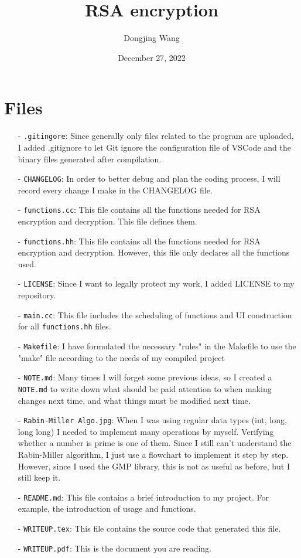 \documentclass{article}
\title{RSA encryption}
\author{Dongjing Wang}
\date{December 27, 2022}
\begin{document}
\maketitle

\section{Files}
    \begin{enumerate}
        \item[-] \texttt{.gitingore}: Since generally only files related to the program are uploaded, I added .gitignore to let Git ignore the configuration file of VSCode and the binary files generated after compilation.
        \item[-] \texttt{CHANGELOG}: In order to better debug and plan the coding process, I will record every change I make in the CHANGELOG file.
        \item[-] \texttt{functions.cc}: This file contains all the functions needed for RSA encryption and decryption. This file defines them.
        \item[-] \texttt{functions.hh}: This file contains all the functions needed for RSA encryption and decryption. However, this file only declares all the functions used.
        \item[-] \texttt{LICENSE}: Since I want to legally protect my work, I added LICENSE to my repository.
        \item[-] \texttt{main.cc}: This file includes the scheduling of functions and UI construction for all \texttt{functions.hh} files.
        \item[-] \texttt{Makefile}: I have formulated the necessary "rules" in the Makefile to use the "make" file according to the needs of my compiled project
        \item[-] \texttt{NOTE.md}: Many times I will forget some previous ideas, so I created a \texttt{NOTE.md} to write down what should be paid attention to when making changes next time, and what things must be modified next time.
        \item[-] \texttt{Rabin-Miller Algo.jpg}: When I was using regular data types (int, long, long long) I needed to implement many operations by myself. Verifying whether a number is prime is one of them. Since I still can't understand the Rabin-Miller algorithm, I just use a flowchart to implement it step by step. However, since I used the GMP library, this is not as useful as before, but I still keep it.
        \item[-] \texttt{README.md}: This file contains a brief introduction to my project. For example, the introduction of usage and functions.
        \item[-] \texttt{WRITEUP.tex}: This file contains the source code that generated this file.
        \item[-] \texttt{WRITEUP.pdf}: This is the document you are reading.
    \end{enumerate}
\end{document}
